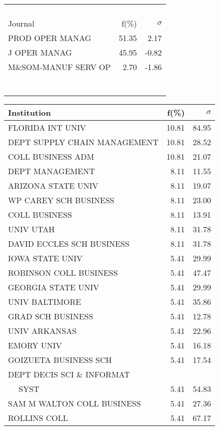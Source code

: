 \documentclass[a4paper,11pt]{report}
\begin{document}
\begin{landscape}
\begin{table}[!ht]
{\begin{tabular}{|l r r|}
 &  & \\
 &  & \\
 &  & \\
 &  & \\
\hline
\hline
Journal & f(\%) & $\sigma$\\
\hline
PROD OPER MANAG & 51.35 & 2.17\\
J OPER MANAG & 45.95 & -0.82\\
M\&SOM-MANUF SERV OP & 2.70 & -1.86\\
 &  & \\
 &  & \\
 &  & \\
 &  & \\
 &  & \\
 &  & \\
 &  & \\
\hline
\end{tabular}
}
{\scriptsize\begin{tabular}{|l r r|}
\hline
Institution & f(\%) & $\sigma$\\
\hline
FLORIDA INT UNIV & 10.81 & 84.95\\
DEPT SUPPLY CHAIN MANAGEMENT & 10.81 & 28.52\\
COLL BUSINESS ADM & 10.81 & 21.07\\
DEPT MANAGEMENT & 8.11 & 11.55\\
ARIZONA STATE UNIV & 8.11 & 19.07\\
WP CAREY SCH BUSINESS & 8.11 & 23.00\\
COLL BUSINESS & 8.11 & 13.91\\
UNIV UTAH & 8.11 & 31.78\\
DAVID ECCLES SCH BUSINESS & 8.11 & 31.78\\
IOWA STATE UNIV & 5.41 & 29.99\\
ROBINSON COLL BUSINESS & 5.41 & 47.47\\
GEORGIA STATE UNIV & 5.41 & 29.99\\
UNIV BALTIMORE & 5.41 & 35.86\\
GRAD SCH BUSINESS & 5.41 & 12.78\\
UNIV ARKANSAS & 5.41 & 22.96\\
EMORY UNIV & 5.41 & 16.18\\
GOIZUETA BUSINESS SCH & 5.41 & 17.54\\
DEPT DECIS SCI \& INFORMAT &  & \\
$\quad$ SYST & 5.41 & 54.83\\
SAM M WALTON COLL BUSINESS & 5.41 & 27.36\\
ROLLINS COLL & 5.41 & 67.17\\

\end{tabular}}
\end{table}
\end{landscape}
\end{document}
